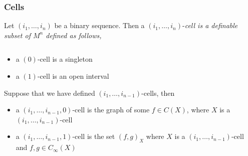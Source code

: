 \begin{frame}[c]\frametitle{Cells}

		Let $(i_1,\ldots,i_n)$ be a binary sequence. Then a $(i_1,\ldots,i_n)$-\em cell \em is a definable subset of $M^n$ defined as follows,
		\begin{columns}

			\begin{column}{7cm}
					\begin{itemize}
						\item a $(0)$-cell is a singleton
						\item a $(1)$-cell is an open interval
					\end{itemize}
					Suppose that we have defined $(i_1,\ldots,i_{n-1})$-cells, then
					\begin{itemize}
						\item<2-> a $(i_1,\ldots,i_{n-1},0)$-cell is the graph of some $f \in C(X)$,
						where $X$ is a  $(i_1,\ldots,i_{n-1})$-cell
						\item<3-> a $(i_1,\ldots,i_{n-1},1)$-cell is the set $(f,g)_X$ where $X$ is a
						$(i_1,\ldots,i_{n-1})$-cell and $f,g \in C_\infty(X)$
					\end{itemize}

			\end{column}

			\begin{column}{4.5cm}



			\end{column}


		\end{columns}
\end{frame}

